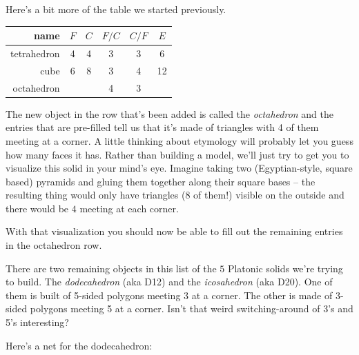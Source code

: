 \vspace{.5in} 

Here's a bit more of the table we started previously.

\bigskip
\setlength{\tabcolsep}{18pt}
\begin{tabular}{r|c|c|c|c|c} 
\bigstrut name        & $F$ & $C$ & $F/C$ & $C/F$ & $E$ \\ \hline
\bigstrut tetrahedron & 4   & 4   & 3     & 3     & 6 \\ \hline
\bigstrut cube        & 6   & 8   & 3     & 4     & 12 \\ \hline
\bigstrut octahedron  &     &     & 4     & 3     &   \\
\end{tabular}
\bigskip

The new object in the row that's been added is called the {\em octahedron} and the entries that are pre-filled tell us that it's made of triangles with 4 of them meeting at a corner. A little thinking about etymology will probably let you guess how many faces it has.  Rather than building a model, we'll just try to get you to visualize this solid in your mind's eye.  Imagine taking two (Egyptian-style, square based) pyramids and gluing them together along their square bases -- the resulting thing would only have triangles (8 of them!) visible on the outside and there would be $4$ meeting at each corner.


With that visualization you should now be able to fill out the remaining entries in the octahedron row.

There are two remaining objects in this list of the $5$ Platonic solids we're trying to build.
The {\em dodecahedron} (aka D12) and the {\em icosahedron} (aka D20).  One of them is built of 5-sided polygons meeting 3 at a corner.  The other is made of 3-sided polygons meeting 5 at a corner.  Isn't that weird switching-around of 3's and 5's interesting?

Here's a net for the dodecahedron:
\bigskip

